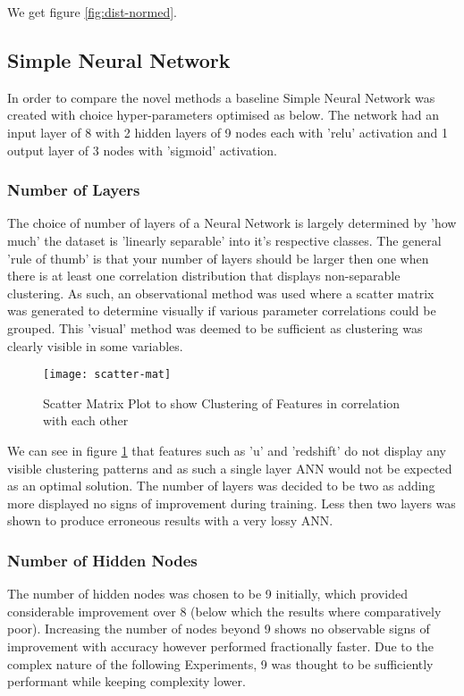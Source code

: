 \documentclass[conference]{IEEEtran}
\begin{document}
We get figure \ref{fig:dist-normed}.

\subsection{Simple Neural Network}
In order to compare the novel methods a baseline Simple Neural Network was created with choice hyper-parameters optimised as below. The network had an input layer of 8 with 2 hidden layers of 9 nodes each with 'relu' activation and 1 output layer of 3 nodes with 'sigmoid' activation.
\subsubsection{Number of Layers}
The choice of number of layers of a Neural Network is largely determined by 'how much' the dataset is 'linearly separable' into it's respective classes. The general 'rule of thumb' is that your number of layers should be larger then one when there is at least one correlation distribution that displays non-separable clustering. \cite{s-j-kwon-anns}
As such, an observational method was used where a scatter matrix was generated to determine visually if various parameter correlations could be grouped. This 'visual' method was deemed to be sufficient as clustering was clearly visible in some variables.
\begin{figure}
	\caption{Scatter Matrix Plot to show Clustering of Features in correlation with each other}
	\texttt{[image: scatter-mat]}
	\centering
	\label{fig:scatter-matrix}
\end{figure}

We can see in figure \ref{fig:scatter-matrix} that features such as 'u' and 'redshift' do not display any visible clustering patterns and as such a single layer ANN would not be expected as an optimal solution.
The number of layers was decided to be two as adding more displayed no signs of improvement during training. Less then two layers was shown to produce erroneous results with a very lossy ANN.

\subsubsection{Number of Hidden Nodes}
The number of hidden nodes was chosen to be 9 initially, which provided considerable improvement over 8 (below which the results where comparatively poor). Increasing the number of nodes beyond 9 shows no observable signs of improvement with accuracy however performed fractionally faster. 
Due to the complex nature of the following Experiments, 9 was thought to be sufficiently performant while keeping complexity lower.
\end{document}
